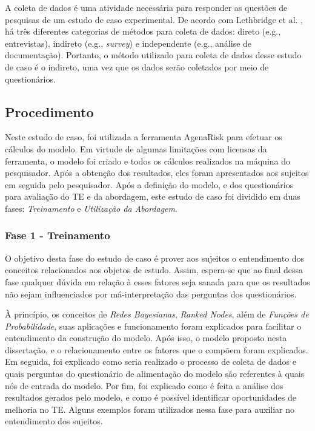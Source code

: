 A coleta de dados é uma atividade necessária para responder as questões de pesquisas de um estudo de caso experimental. De acordo com Lethbridge et al. \cite{lethbridge}, há três diferentes categorias de métodos para coleta de dados: direto (e.g., entrevistas), indireto (e.g., \textit{survey}) e independente (e.g., análise de documentação). Portanto, o método utilizado para coleta de dados desse estudo de caso é o indireto, uma vez que os dados serão coletados por meio de questionários.

\subsection{Procedimento}
\label{estudodecaso:design:procedimento}

Neste estudo de caso, foi utilizada a ferramenta AgenaRisk para efetuar os cálculos do modelo. Em virtude de algumas limitações com licensas da ferramenta, o modelo foi criado e todos os cálculos realizados na máquina do pesquisador. Após a obtenção dos resultados, eles foram apresentados aos sujeitos em seguida pelo pesquisador. Após a definição do modelo, e dos questionários para avaliação do TE e da abordagem, este estudo de caso foi dividido em duas fases: \textit{Treinamento} e \textit{Utilização da Abordagem}.

\subsubsection{Fase 1 - Treinamento}
\label{estudodecaso:design:procedimento:treinamento}

O objetivo desta fase do estudo de caso é prover aos sujeitos o entendimento dos conceitos relacionados aos objetos de estudo. Assim, espera-se que ao final dessa fase qualquer dúvida em relação à esses fatores seja sanada para que os resultados não sejam influenciados por má-interpretação das perguntas dos questionários.

À princípio, os conceitos de \textit{Redes Bayesianas}, \textit{Ranked Nodes}, além de \textit{Funções de Probabilidade}, suas aplicações e funcionamento foram explicados para facilitar o entendimento da construção do modelo. Após isso, o modelo proposto nesta dissertação, e o relacionamento entre os fatores que o compõem foram explicados. Em seguida, foi explicado como seria realizado o processo de coleta de dados e quais perguntas do questionário de alimentação do modelo são referentes à quais nós de entrada do modelo. Por fim, foi explicado como é feita a análise dos resultados gerados pelo modelo, e como é possível identificar oportunidades de melhoria no TE. Alguns exemplos foram utilizados nessa fase para auxiliar no entendimento dos sujeitos.

